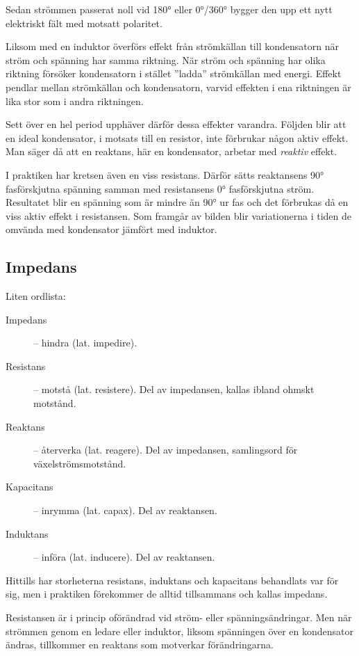 Sedan strömmen passerat noll vid \ang{180} eller \ang{0}/\ang{360} bygger den
upp ett nytt elektriskt fält med motsatt polaritet.

Liksom med en induktor överförs effekt från strömkällan till kondensatorn när
ström och spänning har samma riktning.
När ström och spänning har olika riktning försöker kondensatorn i stället
''ladda'' strömkällan med energi.
Effekt pendlar mellan strömkällan och kondensatorn, varvid effekten i
ena riktningen är lika stor som i andra riktningen.

Sett över en hel period upphäver därför dessa effekter varandra.
Följden blir att en ideal kondensator, i motsats till en resistor, inte
förbrukar någon aktiv effekt.
Man säger då att en reaktans, här en kondensator, arbetar med \emph{reaktiv}
effekt.

I praktiken har kretsen även en viss resistans.
Därför sätts reaktansens \ang{90} fasförskjutna spänning samman med
resistansens \ang{0} fasförskjutna ström.
Resultatet blir en spänning som är mindre än \ang{90} ur fas och det
förbrukas då en viss aktiv effekt i resistansen.
Som framgår av bilden blir variationerna i tiden de omvända med kondensator
jämfört med induktor.

\subsection{Impedans}
\label{impedans}

Liten ordlista:
\begin{description}
\item[Impedans] -- hindra (lat. impedire).
\item[Resistans] -- motstå (lat. resistere).
  Del av impedansen, kallas ibland ohmskt motstånd.
\item[Reaktans] -- återverka (lat. reagere).
  Del av impedansen, samlingsord för växelströmsmotstånd.
\item[Kapacitans] -- inrymma (lat. capax). Del av reaktansen.
\item[Induktans] -- införa (lat. inducere). Del av reaktansen.
\end{description}

Hittills har storheterna resistans, induktans och kapacitans behandlats var för
sig, men i praktiken förekommer de alltid tillsammans och kallas impedans.

Resistansen är i princip oförändrad vid ström- eller spänningsändringar.
Men när strömmen genom en ledare eller induktor, liksom spänningen över en
kondensator ändras, tillkommer en reaktans som motverkar förändringarna.

